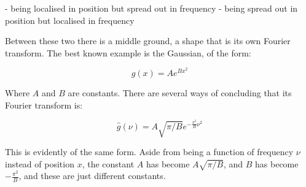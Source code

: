 - being localised in position but spread out in frequency
- being spread out in position but localised in frequency

Between these two there is a middle ground, a shape that is its own Fourier transform. The best known example is the Gaussian, of the form:

$$g(x) = Ae^{Bx^2}$$

Where $A$ and $B$ are constants. There are several ways of concluding that its Fourier transform is:

$$\hat{g}(\nu) = A \sqrt{\pi/B} e^{-\frac{\pi^2}{B} \nu^2}$$

This is evidently of the same form. Aside from being a function of frequency $\nu$ instead of position $x$, the constant $A$ has become $A \sqrt{\pi/B}$, and $B$ has become $-\frac{\pi^2}{B}$, and these are just different constants.
